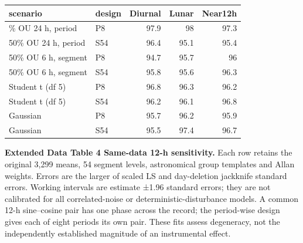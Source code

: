 \documentclass[
  12pt,
  a4paper,
]{article}
\begin{document}
\begin{longtable}[]{@{}llrrr@{}}
\toprule\noalign{}
scenario & design & Diurnal & Lunar & Near12h \\
\midrule\noalign{}
\endhead
\bottomrule\noalign{}
\endlastfoot
50\% OU 24 h, period & P8 & 97.9 & 98 & 97.3 \\
50\% OU 24 h, period & S54 & 96.4 & 95.1 & 95.4 \\
50\% OU 6 h, segment & P8 & 94.7 & 95.7 & 96 \\
50\% OU 6 h, segment & S54 & 95.8 & 95.6 & 96.3 \\
Student t (df 5) & P8 & 96.8 & 96.3 & 96.2 \\
Student t (df 5) & S54 & 96.2 & 96.1 & 96.8 \\
Gaussian & P8 & 95.7 & 96.2 & 95.9 \\
Gaussian & S54 & 95.5 & 97.4 & 96.7 \\
\end{longtable}

\clearpage

\textbf{Extended Data Table 4 \textbar{} Same-data 12-h sensitivity.}
Each row retains the original 3,299 means, 54 segment levels,
astronomical group templates and Allan weights. Errors are the larger of
scaled LS and day-deletion jackknife standard errors. Working intervals
are estimate ±1.96 standard errors; they are not calibrated for all
correlated-noise or deterministic-disturbance models. A common 12-h
sine--cosine pair has one phase across the record; the period-wise
design gives each of eight periods its own pair. These fits assess
degeneracy, not the independently established magnitude of an
instrumental effect.
\end{document}
